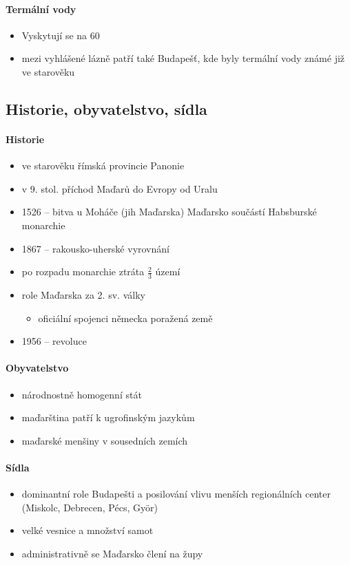 \paragraph{Termální vody}
\begin{itemize}
\item Vyskytují se na 60%
\item mezi vyhlášené lázně patří také Budapešť, kde byly termální vody známé již ve starověku
\end{itemize}

\subsection{Historie, obyvatelstvo, sídla}
\paragraph{Historie}
\begin{itemize}
\item ve starověku římská provincie Panonie
\item v 9. stol. příchod Maďarů do Evropy od Uralu
\item 1526 -- bitva u Moháče (jih Maďarska) \ra Maďarsko součástí Habsburské monarchie
\item 1867 -- rakousko-uherské vyrovnání
\item po rozpadu monarchie ztráta $\frac{2}{3}$ území
\item role Maďarska za 2. sv. války
	\begin{itemize}
	\item oficiální spojenci německa \ra poražená země
	\end{itemize}
	\item 1956 -- revoluce
\end{itemize}

\paragraph{Obyvatelstvo}
\begin{itemize}
\item národnostně homogenní stát
\item maďarština patří k ugrofinským jazykům
\item maďarské menšiny v sousedních zemích
\end{itemize}

\paragraph{Sídla}
\begin{itemize}
\item dominantní role Budapešti a posilování vlivu menších regionálních center (Miskolc, Debrecen, Pécs, Györ)
\item velké vesnice a množství samot
\item administrativně se Maďarsko člení na župy
\end{itemize}

